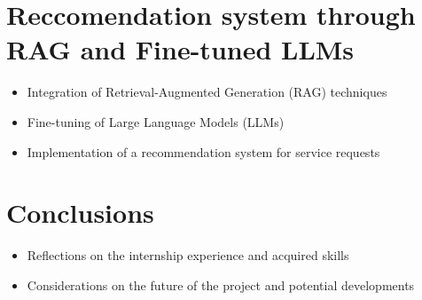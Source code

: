 \documentclass[a4paper, oneside, openright]{book}
\begin{document}
\chapter{Reccomendation system through RAG and Fine-tuned LLMs}
\begin{itemize}
    \item Integration of Retrieval-Augmented Generation (RAG) techniques
    \item Fine-tuning of Large Language Models (LLMs)
    \item Implementation of a recommendation system for service requests
\end{itemize}

\chapter{Conclusions}
\begin{itemize}
    \item Reflections on the internship experience and acquired skills
    \item Considerations on the future of the project and potential developments
\end{itemize}

\backmatter
\sloppy %
\printbibliography[heading=bibintoc, title=Bibliography]

\end{document}

